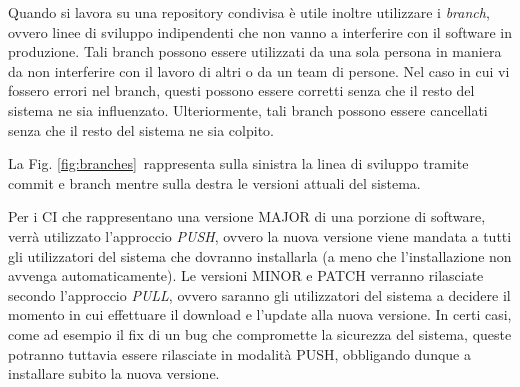 	Quando si lavora su una repository condivisa è utile inoltre utilizzare i \textit{branch}, ovvero linee di sviluppo indipendenti che non vanno a interferire con il software in produzione.
	Tali branch possono essere utilizzati da una sola persona in maniera da non interferire con il lavoro di altri o da un team di persone.
	Nel caso in cui vi fossero errori nel branch, questi possono essere corretti senza che il resto del sistema ne sia influenzato.
	Ulteriormente, tali branch possono essere cancellati senza che il resto del sistema ne sia colpito.
	
	La Fig. \ref{fig:branches}~rappresenta sulla sinistra la linea di sviluppo tramite commit e branch mentre sulla destra le versioni attuali del sistema.
	
	Per i CI che rappresentano una versione MAJOR di una porzione di software, verrà utilizzato l'approccio \textit{PUSH}, ovvero la nuova versione viene mandata a tutti gli utilizzatori del sistema che dovranno installarla (a meno che l'installazione non avvenga automaticamente).
	Le versioni MINOR e PATCH verranno rilasciate secondo l'approccio \textit{PULL}, ovvero saranno gli utilizzatori del sistema a decidere il momento in cui effettuare il download e l'update alla nuova versione.
	In certi casi, come ad esempio il fix di un bug che compromette la sicurezza del sistema, queste potranno tuttavia essere rilasciate in modalità PUSH, obbligando dunque a installare subito la nuova versione.
	
